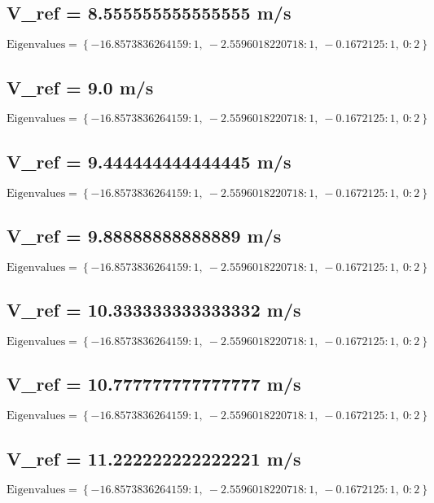 \documentclass{article}
\begin{document}
\subsection*{V_ref = 8.555555555555555 m/s}
\begin{equation}
\text{Eigenvalues} = \left\{ -16.8573836264159 : 1, \  -2.5596018220718 : 1, \  -0.1672125 : 1, \  0 : 2\right\}
\end{equation}
\subsection*{V_ref = 9.0 m/s}
\begin{equation}
\text{Eigenvalues} = \left\{ -16.8573836264159 : 1, \  -2.5596018220718 : 1, \  -0.1672125 : 1, \  0 : 2\right\}
\end{equation}
\subsection*{V_ref = 9.444444444444445 m/s}
\begin{equation}
\text{Eigenvalues} = \left\{ -16.8573836264159 : 1, \  -2.5596018220718 : 1, \  -0.1672125 : 1, \  0 : 2\right\}
\end{equation}
\subsection*{V_ref = 9.88888888888889 m/s}
\begin{equation}
\text{Eigenvalues} = \left\{ -16.8573836264159 : 1, \  -2.5596018220718 : 1, \  -0.1672125 : 1, \  0 : 2\right\}
\end{equation}
\subsection*{V_ref = 10.333333333333332 m/s}
\begin{equation}
\text{Eigenvalues} = \left\{ -16.8573836264159 : 1, \  -2.5596018220718 : 1, \  -0.1672125 : 1, \  0 : 2\right\}
\end{equation}
\subsection*{V_ref = 10.777777777777777 m/s}
\begin{equation}
\text{Eigenvalues} = \left\{ -16.8573836264159 : 1, \  -2.5596018220718 : 1, \  -0.1672125 : 1, \  0 : 2\right\}
\end{equation}
\subsection*{V_ref = 11.222222222222221 m/s}
\begin{equation}
\text{Eigenvalues} = \left\{ -16.8573836264159 : 1, \  -2.5596018220718 : 1, \  -0.1672125 : 1, \  0 : 2\right\}
\end{equation}
\end{document}
